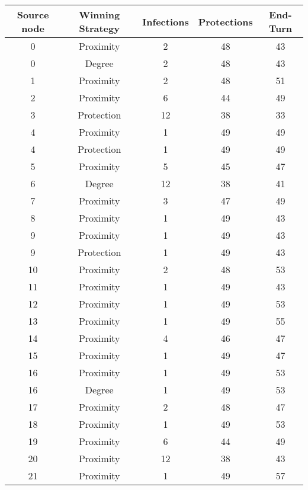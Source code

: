\documentclass[results.tex]{subfiles}
\begin{document}
\begin{center}
  \begin{tabular}{| c || c | c | c | c |}
    \hline
    {\bfseries Source node} & {\bfseries Winning Strategy} & {\bfseries Infections} & {\bfseries Protections} & {\bfseries End-Turn} \\  %
    \hline\hline
    0 & Proximity & 2 & 48 & 43 \\ 
    \hline
    0 & Degree & 2 & 48 & 43 \\ 
    \hline
    1 & Proximity & 2 & 48 & 51 \\ 
    \hline
    2 & Proximity & 6 & 44 & 49 \\ 
    \hline
    3 & Protection & 12 & 38 & 33 \\ 
    \hline
    4 & Proximity & 1 & 49 & 49 \\ 
    \hline
    4 & Protection & 1 & 49 & 49 \\ 
    \hline
    5 & Proximity & 5 & 45 & 47 \\ 
    \hline
    6 & Degree & 12 & 38 & 41 \\ 
    \hline
    7 & Proximity & 3 & 47 & 49 \\ 
    \hline
    8 & Proximity & 1 & 49 & 43 \\ 
    \hline
    9 & Proximity & 1 & 49 & 43 \\ 
    \hline
    9 & Protection & 1 & 49 & 43 \\ 
    \hline
    10 & Proximity & 2 & 48 & 53 \\ 
    \hline
    11 & Proximity & 1 & 49 & 43 \\ 
    \hline
    12 & Proximity & 1 & 49 & 53 \\ 
    \hline
    13 & Proximity & 1 & 49 & 55 \\ 
    \hline
    14 & Proximity & 4 & 46 & 47 \\ 
    \hline
    15 & Proximity & 1 & 49 & 47 \\ 
    \hline
    16 & Proximity & 1 & 49 & 53 \\ 
    \hline
    16 & Degree & 1 & 49 & 53 \\ 
    \hline
    17 & Proximity & 2 & 48 & 47 \\ 
    \hline
    18 & Proximity & 1 & 49 & 53 \\ 
    \hline
    19 & Proximity & 6 & 44 & 49 \\ 
    \hline
    20 & Proximity & 12 & 38 & 43 \\ 
    \hline
    21 & Proximity & 1 & 49 & 57 \\ 

\end{tabular}
\end{center}
\end{document}
